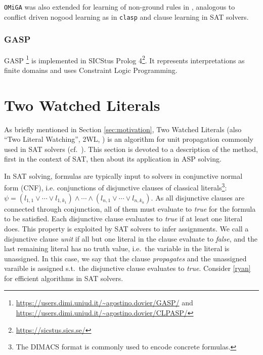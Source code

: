 \documentclass{vutinfth} %
\newcommand{\clasp}{\texttt{clasp}\xspace}
\newcommand{\omiga}{\texttt{OMiGA}\xspace}
\begin{document}
\omiga was also extended for learning of non-ground rules in \cite{nglearn}, analogous to conflict driven nogood learning as in \clasp and clause learning in SAT solvers.

\subsubsection{GASP}

GASP \cite{gasp,gasp2}\footnote{\url{https://users.dimi.uniud.it/~agostino.dovier/GASP/} and\\ \url{https://users.dimi.uniud.it/~agostino.dovier/CLPASP/}} is implemented in SICStus Prolog 4\footnote{\url{https://sicstus.sics.se/}}. It represents interpretations as finite domains and uses Constraint Logic Programming.



\section{Two Watched Literals}
\label{sec:2wl}

As briefly mentioned in Section \ref{sec:motivation}, Two Watched Literals (also \enquote{Two Literal Watching}, 2WL, \cite{effsat,questsat}) is an algorithm for unit propagation commonly used in SAT solvers (cf.~\cite[Section 2.2.2, p.~94]{handbook-sat}). This section is devoted to a description of the method, first in the context of SAT, then about its application in ASP solving.

In SAT solving, formulas are typically input to solvers in conjunctive normal form (CNF), i.e. conjunctions of disjunctive clauses of classical literals\footnote{The DIMACS format is commonly used to encode concrete formulas.}: $\psi = (l_{1,1} \vee \cdots \vee l_{1,k_1}) \wedge \cdots \wedge (l_{n,1} \vee \cdots \vee l_{n,k_n})$. As all disjunctive clauses are connected through conjunction, all of them must evaluate to \emph{true} for the formula to be satisfied. Each disjunctive clause evaluates to \emph{true} if at least one literal does. This property is exploited by SAT solvers to infer assignments. We call a disjunctive clause \emph{unit} if all but one literal in the clause evaluate to \emph{false}, and the last remaining literal has no truth value, i.e.~the variable in the literal is unassigned. In this case, we say that the clause \emph{propagates} and the unassigned varaible is assigned s.t.~the disjunctive clause evaluates to \emph{true}. Consider \ref{ryan} for efficient algorithms in SAT solvers.
\end{document}
